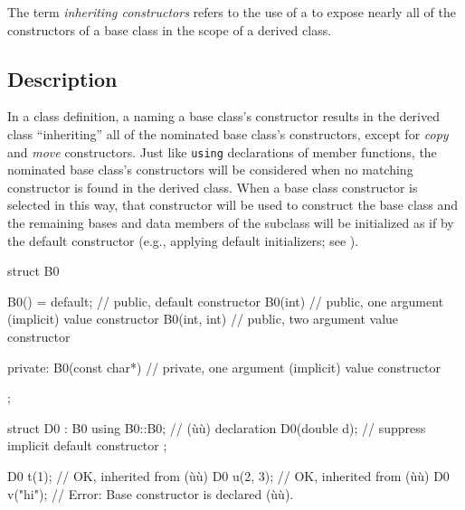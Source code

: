 


\label{inheriting-constructors}
\setcounter{table}{0}
\setcounter{footnote}{0}
\setcounter{lstlisting}{0}



The term \emph{inheriting constructors} refers to the use of a
 to expose nearly all of the
constructors of a base class in the scope of a derived class.

\subsection[Description]{Description}\label{description-inheritingctor}

In a class definition, a  naming a
base class's constructor results in the derived class ``inheriting'' all
of the nominated base class's constructors, except for \emph{copy} and
\emph{move} constructors. Just like \lstinline!using! declarations of member functions, the nominated base class's
constructors will be considered when no matching constructor is found in
the derived class. When a base class constructor is selected in this way,
that constructor will be used to construct the base class and the
remaining bases and data members of the subclass will be initialized as
if by the default constructor (e.g., applying default initializers;
see ).

\begin{emcppslisting}[language=C++]
struct B0
{
    B0() = default;      // public, default constructor
    B0(int)         { }  // public, one argument (implicit) value constructor
    B0(int, int)    { }  // public, two argument value constructor

private:
    B0(const char*) { }  // private, one argument (implicit) value constructor
};

struct D0 : B0
{
    using B0::B0;  // (ù{}ù) declaration
    D0(double d);  // suppress implicit default constructor
};

D0 t(1);     // OK, inherited from (ù{}ù)
D0 u(2, 3);  // OK, inherited from (ù{}ù)
D0 v("hi");  // Error: Base constructor is declared (ù{}ù).
\end{emcppslisting}
    
